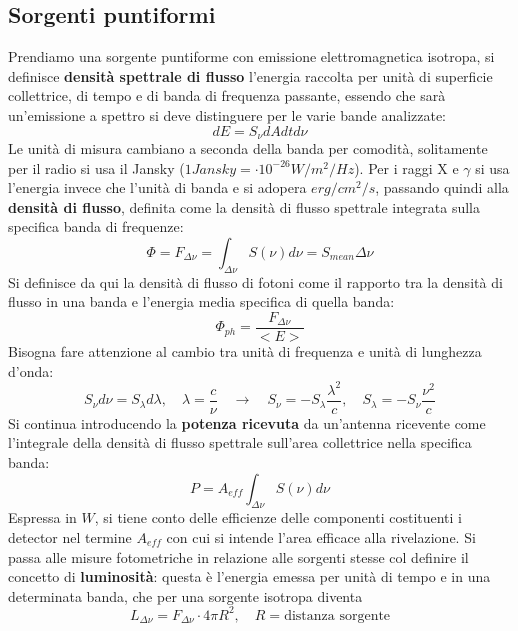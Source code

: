 \documentclass[a4paper,twoside,openany,notitlepage]{book}
\newcommand{\e}[1]{\cdot 10^{#1}}
\theoremstyle{definition}
\theoremstyle{plain}
\begin{document}
\subsection*{Sorgenti puntiformi}
Prendiamo una sorgente puntiforme con emissione elettromagnetica isotropa, si definisce \textbf{densità spettrale di flusso} l'energia raccolta per unità di superficie collettrice, di tempo e di banda di frequenza passante, essendo che sarà un'emissione a spettro si deve distinguere per le varie bande analizzate:
\begin{equation*}
	dE=S_\nu dAdtd\nu
\end{equation*}
Le unità di misura cambiano a seconda della banda per comodità, solitamente per il radio si usa il Jansky ($1 Jansky = \e{-26} W/m^2/Hz$). Per i raggi X e $\gamma$ si usa l'energia invece che l'unità di banda e si adopera $erg/cm^2/s$, passando quindi alla \textbf{densità di flusso}, definita come la densità di flusso spettrale integrata sulla specifica banda di frequenze:
\begin{equation*}
	\Phi=F_{\Delta\nu}=\int_{\Delta\nu}^{}S(\nu)d\nu = S_{mean}\Delta\nu
\end{equation*}
Si definisce da qui la densità di flusso di fotoni come il rapporto tra la densità di flusso in una banda e l'energia media specifica di quella banda:
\begin{equation*}
	\Phi_{ph}=\frac{F_{\Delta\nu}}{<E>}
\end{equation*}
Bisogna fare attenzione al cambio tra unità di frequenza e unità di lunghezza d'onda:
\begin{equation*}
	S_\nu d\nu = S_\lambda d\lambda, \quad \lambda=\frac{c}{\nu} \quad \longrightarrow \quad
	S_\nu = -S_\lambda \frac{\lambda^2}{c}, \quad S_\lambda = -S_\nu \frac{\nu^2}{c}
\end{equation*}
Si continua introducendo la \textbf{potenza ricevuta} da un'antenna ricevente come l'integrale della densità di flusso spettrale sull'area collettrice nella specifica banda:
\begin{equation*}
	P=A_{eff}\int_{\Delta \nu}^{} S(\nu)d\nu
\end{equation*}
Espressa in $W$, si tiene conto delle efficienze delle componenti costituenti i detector nel termine $A_{eff}$ con cui si intende l'area efficace alla rivelazione.
Si passa alle misure fotometriche in relazione alle sorgenti stesse col definire il concetto di \textbf{luminosità}: questa è l'energia emessa per unità di tempo e in una determinata banda, che per una sorgente isotropa diventa
\begin{equation*}
	L_{\Delta\nu} =F_{\Delta\nu} \cdot 4\pi R^2, \quad R=\text{distanza sorgente}
\end{equation*}
\end{document}
